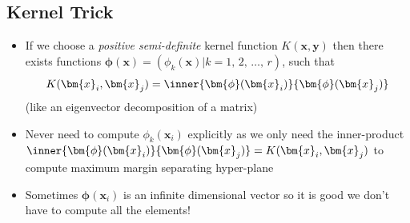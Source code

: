 
\begin{slide}
\section[-1]{Kernel Trick}

\begin{PauseHighLight}
  \begin{itemize}
  \item If we choose a \emph{positive semi-definite} kernel function
    $K(\bm{x}, \bm{y})$ then there exists functions
    $\bm{\phi}(\bm{x}) = (\phi_k(\bm{x})|k=1,\,2,\,\ldots,\,r)$,
    such that
    \begin{align*}
      K(\bm{x}_i, \bm{x}_j) = \inner{\bm{\phi}(\bm{x}_i)}{
      \bm{\phi}(\bm{x}_j)}
    \end{align*}
    (like an eigenvector decomposition of a matrix)\pause
  \item Never need to compute $\phi_k(\bm{x}_i)$ explicitly as we only
    need the inner-product $\inner{\bm{\phi}(\bm{x}_i)}{
      \bm{\phi}(\bm{x}_j)} = K(\bm{x}_i, \bm{x}_j)$ to compute maximum
      margin separating hyper-plane\pause
    \item Sometimes $\bm{\phi}(\bm{x}_i)$ is an infinite dimensional
      vector so it is good we don't have to compute all the elements!\pause
  \end{itemize}
\end{PauseHighLight}

\end{slide}

